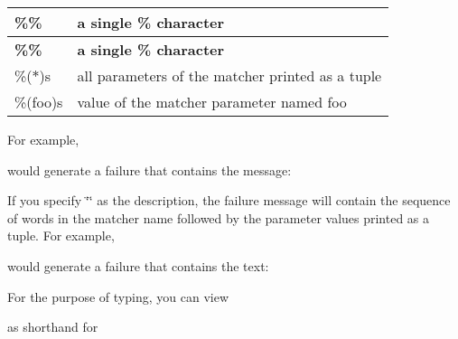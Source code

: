 \tabulinesep=1mm
\begin{longtabu}spread 0pt [c]{*{2}{|X[-1]}|}
\hline
\cellcolor{\tableheadbgcolor}\textbf{ {\ttfamily \%\%}  }&\cellcolor{\tableheadbgcolor}\textbf{ a single {\ttfamily \%} character   }\\
\endfirsthead
\hline
\endfoot
\hline
\cellcolor{\tableheadbgcolor}\textbf{ {\ttfamily \%\%}  }&\cellcolor{\tableheadbgcolor}\textbf{ a single {\ttfamily \%} character   }\\
\endhead
{\ttfamily \%($\ast$)s}  &all parameters of the matcher printed as a tuple   \\
{\ttfamily \%(foo)s}  &value of the matcher parameter named {\ttfamily foo}   \\
\end{longtabu}


For example, 
\begin{DoxyCode}{0}
\DoxyCodeLine{\}}
\end{DoxyCode}
 would generate a failure that contains the message\+: 
\begin{DoxyCode}{0}
\end{DoxyCode}


If you specify {\ttfamily \char`\"{}\char`\"{}} as the description, the failure message will contain the sequence of words in the matcher name followed by the parameter values printed as a tuple. For example, 
\begin{DoxyCode}{0}
\end{DoxyCode}
 would generate a failure that contains the text\+: 
\begin{DoxyCode}{0}
\end{DoxyCode}


For the purpose of typing, you can view 
\begin{DoxyCode}{0}
\end{DoxyCode}
 as shorthand for 
\begin{DoxyCode}{0}
\end{DoxyCode}


